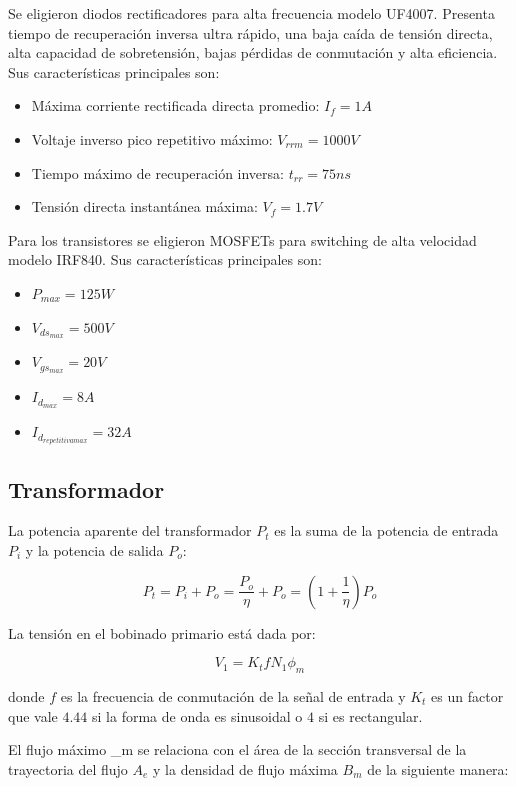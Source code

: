 Se eligieron diodos rectificadores para alta frecuencia modelo UF4007. 
Presenta tiempo de recuperación inversa ultra rápido, una baja caída de tensión directa, alta capacidad de sobretensión, bajas pérdidas de conmutación y alta eficiencia.
Sus características principales son: 

\begin{itemize}
    \item Máxima corriente rectificada directa promedio: $I_f=1A$
    \item Voltaje inverso pico repetitivo máximo: $V_{rrm}=1000V$
    \item Tiempo máximo de recuperación inversa: $t_{rr}=75ns$
    \item Tensión directa instantánea máxima: $V_f=1.7V$
\end{itemize}

Para los transistores se eligieron MOSFETs para switching de alta velocidad modelo IRF840. 
Sus características principales son: 

\begin{itemize}
    \item $P_{max}=125W$
    \item $V_{ds_{max}}=500V$
    \item $V_{gs_{max}}=20V$
    \item $I_{d_{max}}=8A$
    \item $I_{d_{repetitiva max}}=32A$
\end{itemize}

\subsection{Transformador}

La potencia aparente del transformador $P_{t}$ es la suma de la potencia de entrada $P_{i}$ y la potencia de salida $P_{o}$:

$$ P_{t}=P_{i}+P_{o}=\frac{P_{o}}{\eta}+P_{o}=\left(1+\frac{1}{\eta}\right)P_{o} $$

La tensión en el bobinado primario está dada por: 

$$ V_{1}=K_{t} f N_{1} \phi_{m} $$

donde $f$ es la frecuencia de conmutación de la señal de entrada y 
$K_t$ es un factor que vale $4.44$ si la forma de onda es sinusoidal o $4$ si es rectangular.

El flujo máximo \phi_{m} se relaciona con el área de la sección transversal de la trayectoria del flujo $A_{e}$ y la densidad de flujo máxima $B_{m}$ de la siguiente manera:


